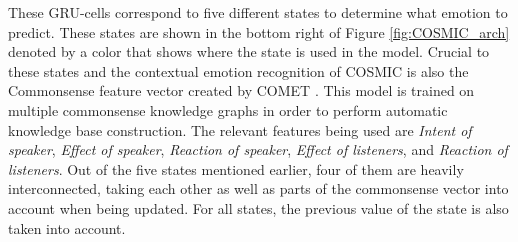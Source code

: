 \documentclass[nofilelist]{cslthse-msc}
\begin{document}
These GRU-cells correspond to five different states to determine what emotion to predict. These states are shown in the bottom right of Figure \ref{fig:COSMIC_arch} denoted by a color that shows where the state is used in the model.
Crucial to these states and the contextual emotion recognition of COSMIC is also the Commonsense feature vector created by COMET \citep{Bosselut2019COMETCT}. This model is trained on multiple commonsense knowledge graphs in order to perform automatic knowledge base construction. The relevant features being used are \textit{Intent of speaker}, \textit{Effect of speaker}, \textit{Reaction of speaker}, \textit{Effect of listeners}, and \textit{Reaction of listeners}.
Out of the five states mentioned earlier, four of them are heavily interconnected, taking each other as well as parts of the commonsense vector into account when being updated. For all states, the previous value of the state is also taken into account.
\end{document}
